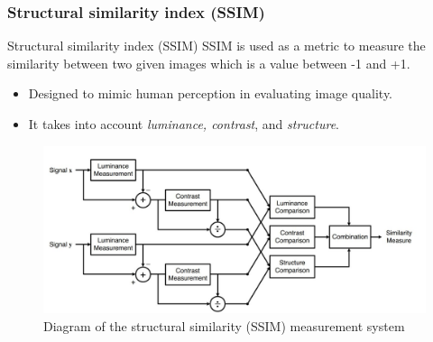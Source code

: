 \documentclass[13.5pt,aspecratio=169, xcolor=dvipsnames]{beamer}
\begin{document}
\begin{frame}
    \onehalfspacing
        \frametitle{Structural similarity index (SSIM)}
        
        \begin{block}{Structural similarity index (SSIM)}
            SSIM is used as a metric to measure the similarity between two given images which is a value between -1 and +1.
            \begin{itemize}
            \item Designed to mimic human perception in evaluating image quality.
            \item It takes into account \textit{luminance, contrast}, and \textit{structure}.
            \end{itemize}
        \end{block}

        \begin{figure}[h]
            \centering
            \includegraphics[width=0.7\linewidth]{SSIM.jpg}
            \caption{Diagram of the structural similarity (SSIM) measurement system}
        \end{figure}
      
\end{frame}
    
\end{document}

